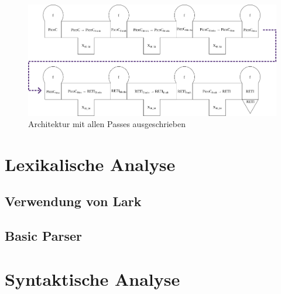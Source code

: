 \begin{figure}[H]
  \centering
  \includegraphics[width=\linewidth]{./figures/passes.png}
  \caption{Architektur mit allen Passes ausgeschrieben}
\end{figure}

\section{Lexikalische Analyse}
\subsection{Verwendung von Lark}
\label{sec:lex_analyse_verwendung_von_lark}


\begin{grammar}
\end{grammar}



\subsection{Basic Parser}
\section{Syntaktische Analyse}
